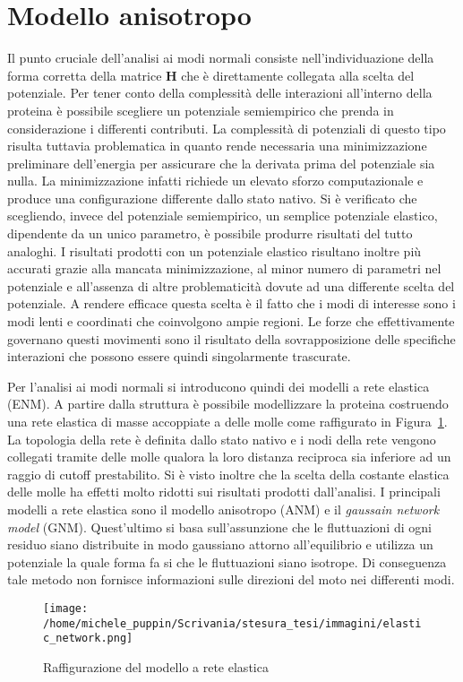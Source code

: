\section{Modello anisotropo}
Il punto cruciale dell'analisi ai modi normali consiste nell'individuazione della forma corretta della matrice $ \mathbf{H} $ che è direttamente collegata alla scelta del potenziale.
Per tener conto della complessità delle interazioni all'interno della proteina è possibile scegliere un potenziale semiempirico che prenda in considerazione i differenti contributi. La complessità di potenziali di questo tipo risulta tuttavia problematica in quanto rende necessaria una minimizzazione preliminare dell'energia per assicurare che la derivata prima del potenziale sia nulla. La minimizzazione infatti richiede un elevato sforzo computazionale e produce una configurazione differente dallo stato nativo. 
Si è verificato che scegliendo, invece del potenziale semiempirico, un semplice potenziale elastico, dipendente da un unico parametro, è possibile produrre risultati del tutto analoghi. I risultati prodotti con un potenziale elastico risultano inoltre più accurati grazie alla mancata minimizzazione, al minor numero di parametri nel potenziale e all'assenza di altre problematicità dovute ad una differente scelta del potenziale. 
A rendere efficace questa scelta è il fatto che i modi di interesse sono i modi lenti e coordinati che coinvolgono ampie regioni. Le forze che effettivamente governano questi movimenti sono il risultato della sovrapposizione delle specifiche interazioni che possono essere quindi singolarmente trascurate. \cite{phys_rev}

Per l'analisi ai modi normali si introducono quindi dei modelli a rete elastica (ENM). A partire dalla struttura è possibile modellizzare la proteina costruendo una rete elastica di masse accoppiate a delle molle come raffigurato in Figura~\ref{fig:elastic_network}. La topologia della rete è definita dallo stato nativo e i nodi della rete vengono collegati tramite delle molle qualora la loro distanza reciproca sia inferiore ad un raggio di cutoff prestabilito. Si è visto inoltre che la scelta della costante elastica delle molle ha effetti molto ridotti sui risultati prodotti dall'analisi. \cite{phys_rev}
I principali modelli a rete elastica sono il modello anisotropo (ANM) e il \textit{gaussain network model} (GNM). Quest'ultimo si basa sull'assunzione che le fluttuazioni di ogni residuo siano distribuite in modo gaussiano attorno all'equilibrio e utilizza un potenziale la quale forma fa si che le fluttuazioni siano isotrope. Di conseguenza tale metodo non fornisce informazioni sulle direzioni del moto nei differenti modi. \cite{iop_science}
\begin{figure}[h]
	\centering
	\texttt{[image: /home/michele\_puppin/Scrivania/stesura\_tesi/immagini/elastic\_network.png]}
	\caption{Raffigurazione del modello a rete elastica \cite{iop_science}}
	\label{fig:elastic_network}
\end{figure}

